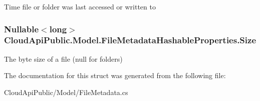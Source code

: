 Time file or folder was last accessed or written to 

\hypertarget{struct_cloud_api_public_1_1_model_1_1_file_metadata_hashable_properties_ade86f4137b38370bc8a7e3e73721a2a2}{
\subsubsection[{Size}]{\setlength{\rightskip}{0pt plus 5cm}Nullable$<$long$>$ Cloud\-Api\-Public.\-Model.\-File\-Metadata\-Hashable\-Properties.\-Size\hspace{0.3cm}{\ttfamily [get]}}}\label{struct_cloud_api_public_1_1_model_1_1_file_metadata_hashable_properties_ade86f4137b38370bc8a7e3e73721a2a2}


The byte size of a file (null for folders) 



The documentation for this struct was generated from the following file\-:\begin{DoxyCompactItemize}
\item 
Cloud\-Api\-Public/\-Model/File\-Metadata.\-cs\end{DoxyCompactItemize}
